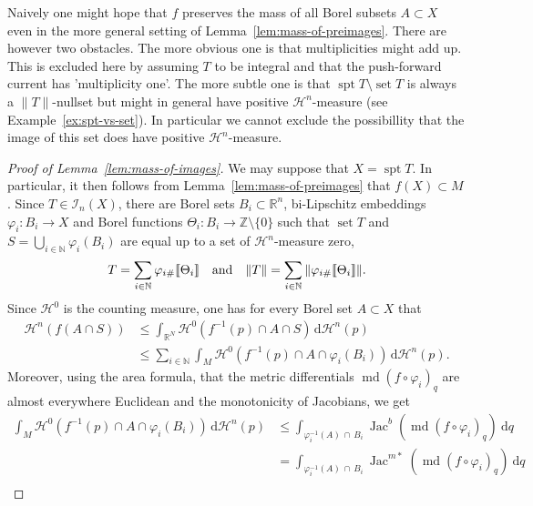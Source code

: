 \documentclass[reqno]{amsart}
\numberwithin{equation}{section}
\newcommand{\R}{\mathbb{R}}
\newcommand{\spt}{\operatorname{spt}}
\newcommand{\Jac}{\operatorname{Jac}}
\newcommand{\md}{\operatorname{md}}
\newcommand{\norm}[1]{\lVert#1\rVert}
\newcommand{\bb}[1]{\llbracket #1\rrbracket}
\DeclareMathOperator{\set}{set}
\begin{document}
Naively one might hope that $f$ preserves the mass of all Borel subsets $A\subset X$ even in the more general setting of Lemma~\ref{lem:mass-of-preimages}. There are however two obstacles. The more obvious one is that multiplicities might add up. This is excluded here by assuming $T$ to be integral and that the push-forward current has 'multiplicity one'. The more subtle one is that $\spt T\setminus \set T$ is always a $\norm{T}$-nullset but might in general have positive $\mathcal{H}^n$-measure (see Example~\ref{ex:spt-vs-set}). In particular we cannot exclude the possibillity that the image of this set does have positive $\mathcal{H}^n$-measure.

\begin{proof}[Proof of Lemma~\ref{lem:mass-of-images}]
We may suppose that \(X= \spt T\). In particular, it then follows from Lemma~\ref{lem:mass-of-preimages} that \(f(X)\subset M\). Since \(T\in \mathcal{I}_n(X)\), there are Borel sets $B_i\subset \mathbb{R}^n$, bi-Lipschitz embeddings $\varphi_i \colon B_i\to X$ and Borel functions $\Theta_i \colon B_i \to \mathbb{Z}\setminus\{0\}$ such that \(\set T\) and $S=\bigcup_{i\in \mathbb{N}}\varphi_i(B_i)$ are equal up to a set of \(\mathcal{H}^n\)-measure zero, 
\begin{equation}\label{eq:decomposition-1}
    T=\sum_{i\in \mathbb{N}} \varphi_{i\#} \bb{\Theta_i} \quad \textnormal{and} \quad \norm{T}=\sum_{i\in \mathbb{N}}\, \norm{\varphi_{i\#} \bb{\Theta_i}}.
\end{equation}
 Since $\mathcal{H}^0$ is the counting measure, one has for every Borel set $A\subset X$ that
\begin{align}\label{eq:x}
    \mathcal{H}^n(f(A\cap S))&\leq \int_{\R^N} \mathcal{H}^0\left( f^{-1}(p)\cap A \cap S \right)\, \mathrm{d}\mathcal{H}^n(p) \nonumber \\
    &\leq\sum_{i\in \mathbb{N}}\int_{M} \mathcal{H}^0\left( f^{-1}(p)\cap A \cap \varphi_i(B_i)\right)\, \mathrm{d}\mathcal{H}^n(p).
\end{align}
Moreover, using the area formula, that the metric differentials $\md (f\circ \varphi_i)_q$ are almost everywhere Euclidean and the monotonicity of Jacobians, we get 
\begin{align}\label{eq:xx}
 \int_{M}\mathcal{H}^0\left( f^{-1}(p)\cap A \cap \varphi_i(B_i)\right)\, \mathrm{d}\mathcal{H}^n(p)&\leq \int_{\varphi^{-1}_i(A)\,\cap \,B_i}  \Jac^{b}(\md (f\circ \varphi_i)_q)\ \textrm{d}q \nonumber \\
 &=\int_{\varphi^{-1}_i(A)\,\cap \,B_i}  \Jac^{m*}(\md (f\circ \varphi_i)_q)\ \textrm{d}q \nonumber\\

\end{align}
\end{proof}
\end{document}

